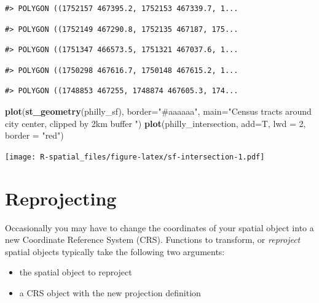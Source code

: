 \documentclass[
]{book}
\newenvironment{Shaded}{\begin{snugshade}}{\end{snugshade}}
\newcommand{\AttributeTok}[1]{\textcolor[rgb]{0.13,0.29,0.53}{#1}}
\newcommand{\DecValTok}[1]{\textcolor[rgb]{0.00,0.00,0.81}{#1}}
\newcommand{\FunctionTok}[1]{\textcolor[rgb]{0.13,0.29,0.53}{\textbf{#1}}}
\newcommand{\NormalTok}[1]{#1}
\newcommand{\StringTok}[1]{\textcolor[rgb]{0.31,0.60,0.02}{#1}}
\providecommand{\tightlist}{%
  \setlength{\itemsep}{0pt}\setlength{\parskip}{0pt}}
\begin{document}
\begin{verbatim}
#> POLYGON ((1752157 467395.2, 1752153 467339.7, 1...
\end{verbatim}

\begin{verbatim}
#> POLYGON ((1752149 467290.8, 1752135 467187, 175...
\end{verbatim}

\begin{verbatim}
#> POLYGON ((1751347 466573.5, 1751321 467037.6, 1...
\end{verbatim}

\begin{verbatim}
#> POLYGON ((1750298 467616.7, 1750148 467615.2, 1...
\end{verbatim}

\begin{verbatim}
#> POLYGON ((1748853 467255, 1748874 467605.3, 174...
\end{verbatim}

\begin{Shaded}
\begin{Highlighting}[]
\FunctionTok{plot}\NormalTok{(}\FunctionTok{st\_geometry}\NormalTok{(philly\_sf), }\AttributeTok{border=}\StringTok{"\#aaaaaa"}\NormalTok{, }\AttributeTok{main=}\StringTok{"Census tracts around city center, clipped by 2km buffer "}\NormalTok{)}
\FunctionTok{plot}\NormalTok{(philly\_intersection, }\AttributeTok{add=}\NormalTok{T, }\AttributeTok{lwd =} \DecValTok{2}\NormalTok{, }\AttributeTok{border =} \StringTok{"red"}\NormalTok{)}
\end{Highlighting}
\end{Shaded}

\texttt{[image: R-spatial\_files/figure-latex/sf-intersection-1.pdf]}

\hypertarget{reprojecting}{%
\section{Reprojecting}\label{reprojecting}}

Occasionally you may have to change the coordinates of your spatial object into a new Coordinate Reference System (CRS). Functions to transform, or \emph{reproject} spatial objects typically take the following two arguments:

\begin{itemize}
\tightlist
\item
  the spatial object to reproject
\item
  a CRS object with the new projection definition
\end{itemize}
\end{document}
